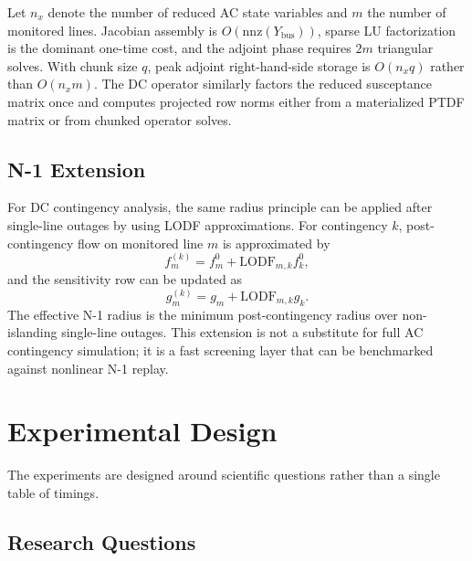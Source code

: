 \documentclass[energies,article,submit,pdftex,moreauthors]{Definitions/mdpi}
\begin{document}
Let $n_x$ denote the number of reduced AC state variables and $m$ the number of monitored lines. Jacobian assembly is $O(\mathrm{nnz}(Y_{\mathrm{bus}}))$, sparse LU factorization is the dominant one-time cost, and the adjoint phase requires $2m$ triangular solves. With chunk size $q$, peak adjoint right-hand-side storage is $O(n_x q)$ rather than $O(n_x m)$. The DC operator similarly factors the reduced susceptance matrix once and computes projected row norms either from a materialized PTDF matrix or from chunked operator solves.

\subsection{N-1 Extension}

For DC contingency analysis, the same radius principle can be applied after single-line outages by using LODF approximations. For contingency $k$, post-contingency flow on monitored line $m$ is approximated by
\begin{equation}
  f_m^{(k)}=f_m^0+\mathrm{LODF}_{m,k} f_k^0,
\end{equation}
and the sensitivity row can be updated as
\begin{equation}
  g_m^{(k)}=g_m+\mathrm{LODF}_{m,k}g_k.
\end{equation}
The effective N-1 radius is the minimum post-contingency radius over non-islanding single-line outages. This extension is not a substitute for full AC contingency simulation; it is a fast screening layer that can be benchmarked against nonlinear N-1 replay.

\section{Experimental Design}
\label{sec:evaluation}

The experiments are designed around scientific questions rather than a single table of timings.

\subsection{Research Questions}
\end{document}
